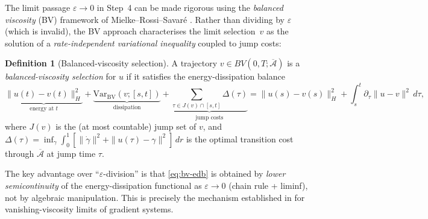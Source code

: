 \documentclass[12pt,a4paper]{article}
\theoremstyle{definition}
\newtheorem{definition}{Definition}[section]
\theoremstyle{plain}
\theoremstyle{remark}
\begin{document}
The limit passage $\varepsilon \to 0$ in Step~4 can be made rigorous using the \emph{balanced viscosity} (BV) framework of Mielke--Rossi--Savar\'e \cite{MielkeRossiSavare2016}. Rather than dividing by $\varepsilon$ (which is invalid), the BV approach characterises the limit selection~$v$ as the solution of a \emph{rate-independent variational inequality} coupled to jump costs:

\begin{definition}[Balanced-viscosity selection]\label{def:bv-selection}
A trajectory $v \in BV(0,T;\overline{\mathcal{A}})$ is a \emph{balanced-viscosity selection} for $u$ if it satisfies the energy-dissipation balance
\begin{equation}\label{eq:bv-edb}
  \underbrace{\|u(t) - v(t)\|_H^2}_{\text{energy at } t} + \underbrace{\mathrm{Var}_{\mathrm{BV}}(v;[s,t])}_{\text{dissipation}} + \underbrace{\sum_{\tau \in J(v) \cap [s,t]} \Delta(\tau)}_{\text{jump costs}} = \|u(s) - v(s)\|_H^2 + \int_s^t \partial_\tau \|u - v\|^2 \, d\tau,
\end{equation}
where $J(v)$ is the (at most countable) jump set of $v$, and $\Delta(\tau) = \inf_\gamma \int_0^1 [\|\dot\gamma\|^2 + \|u(\tau) - \gamma\|^2]\,dr$ is the optimal transition cost through $\overline{\mathcal{A}}$ at jump time $\tau$.
\end{definition}

The key advantage over ``$\varepsilon$-division'' is that \eqref{eq:bv-edb} is obtained by \emph{lower semicontinuity} of the energy-dissipation functional as $\varepsilon \to 0$ (chain rule + liminf), not by algebraic manipulation. This is precisely the mechanism established in \cite{MielkeRossiSavare2016} for vanishing-viscosity limits of gradient systems.
\end{document}

